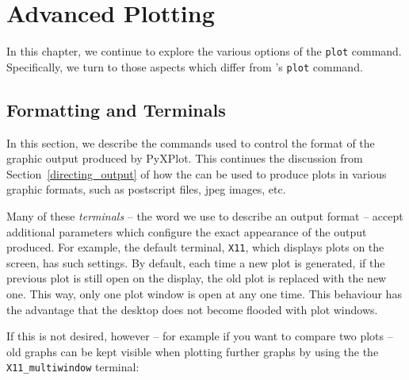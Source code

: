 %
%
%
%
%



\chapter{Advanced Plotting}

In this chapter, we continue to explore the various options of the {\tt plot}
command. Specifically, we turn to those aspects which differ from \gnuplot's
{\tt plot} command.

\section{Formatting and Terminals}
\label{set_terminal2}

In this section, we describe the commands used to control the format of the
graphic output produced by PyXPlot. This continues the discussion from
Section~\ref{directing_output} of how the  can be used to
produce plots in various graphic formats, such as postscript files, jpeg
images, etc.

Many of these {\it terminals} -- the word we use to describe an output format
-- accept additional parameters which configure the exact appearance of the
output produced.  For example, the default terminal, {\tt X11}, which displays
plots on the screen, has such settings. By default, each time a new plot is
generated, if the previous plot is still open on the display, the old plot is
replaced with the new one. This way, only one plot window is open at any one
time.  This behaviour has the advantage that the desktop does not become
flooded with plot windows.

If this is not desired, however -- for example if you want to compare two plots
-- old graphs can be kept visible when plotting further graphs by using the the
{\tt X11\_multiwindow} terminal:

